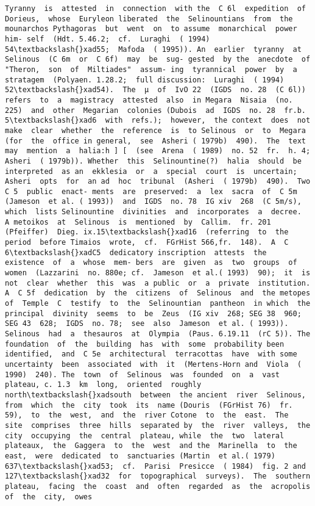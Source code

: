 \documentclass[11pt]{article}
\begin{document}
\begin{Verbatim}[commandchars=\\\{\}]
Tyranny  is  attested  in  connection  with the  C 6l  expedition  of  Dorieus,  whose  Euryleon liberated  the  Selinountians  from  the  mounarchos Pythagoras  but  went  on  to assume  monarchical  power  him- self  (Hdt. 5.46.2;  cf.  Luraghi  ( 1994)  54\textbackslash{}xad55;  Mafoda  ( 1995)). An  earlier  tyranny  at  Selinous  (C 6m  or  C 6f)  may  be  sug- gested  by the  anecdote  of  "Theron,  son  of  Miltiades"  assum- ing  tyrannical  power  by  a  stratagem  (Polyaen. 1.28.2;  full discussion:  Luraghi  ( 1994)  52\textbackslash{}xad54).  The  µ  of  IvO 22  (IGDS  no. 28  (C 6l))  refers  to  a  magistracy  attested  also  in Megara  Nisaia  (no. 225)  and  other  Megarian  colonies (Dubois  ad  IGDS  no. 28  fr.b. 5\textbackslash{}xad6  with  refs.);  however,  the context  does  not  make  clear  whether  the  reference  is  to Selinous  or  to  Megara  (for  the  office in general,  see  Asheri ( 1979b)  490).  The  text  may  mention  a  halia:h ] [  (see  Arena  ( 1989)  no. 52  fr.  h. 4;  Asheri  ( 1979b)). Whether  this  Selinountine(?)  halia  should  be  interpreted  as an  ekklesia  or  a  special  court  is  uncertain;  Asheri  opts  for  an ad  hoc  tribunal  (Asheri  ( 1979b)  490).  Two  C 5  public  enact- ments  are  preserved:  a  lex  sacra  of  C 5m  (Jameson  et al. ( 1993))  and  IGDS  no. 78  IG xiv  268  (C 5m/s),  which  lists Selinountine  divinities  and  incorporates  a  decree.  A metoikos  at  Selinous  is  mentioned  by  Callim.  fr. 201 (Pfeiffer)  Dieg. ix.15\textbackslash{}xad16  (referring  to  the  period  before Timaios  wrote,  cf.  FGrHist 566,fr.  148).  A  C 6\textbackslash{}xadC5  dedicatory inscription  attests  the  existence  of  a  whose  mem- bers  are  given  as  two  groups  of  women  (Lazzarini  no. 880e; cf.  Jameson  et al.( 1993)  90);  it  is  not  clear  whether  this  was  a public  or  a  private  institution. A  C 5f  dedication  by  the  citizens  of  Selinous  and  the metopes  of  Temple  C  testify  to  the  Selinountian  pantheon  in which  the  principal  divinity  seems  to  be  Zeus  (IG xiv  268; SEG 38  960;  SEG 43  628;  IGDS  no. 78;  see  also  Jameson  et al. ( 1993)). Selinous  had  a  thesauros  at  Olympia  (Paus. 6.19.11  (rC 5)). The  foundation  of  the  building  has  with  some  probability been  identified,  and  C 5e  architectural  terracottas  have  with some  uncertainty  been  associated  with  it  (Mertens-Horn and  Viola  ( 1990)  240). The  town  of  Selinous  was  founded  on  a  vast  plateau, c. 1.3  km  long,  oriented  roughly  north\textbackslash{}xadsouth  between  the ancient  river  Selinous,  from  which  the  city  took  its  name (Douris  (FGrHist 76)  fr. 59),  to  the  west,  and  the  river Cotone  to  the  east.  The  site  comprises  three  hills  separated by  the  river  valleys,  the  city  occupying  the  central  plateau, while  the  two  lateral  plateaux,  the  Gaggera  to  the  west  and the  Marinella  to  the  east,  were  dedicated  to  sanctuaries (Martin  et al.( 1979)  637\textbackslash{}xad53;  cf.  Parisi  Presicce  ( 1984)  fig. 2 and 127\textbackslash{}xad32  for  topographical  surveys).  The  southern plateau,  facing  the  coast  and  often  regarded  as  the  acropolis of  the  city,  owes  
\end{Verbatim}
\end{document}
